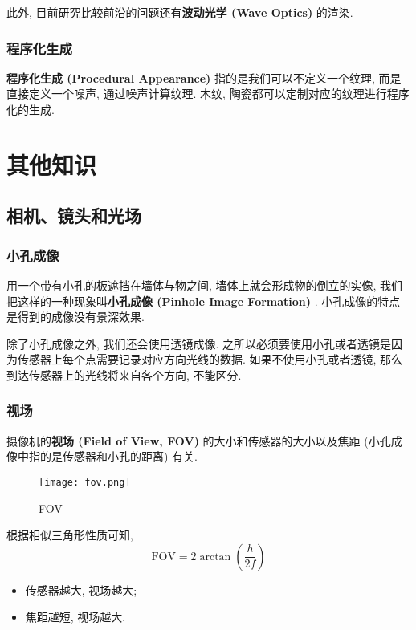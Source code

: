 \documentclass[openany]{progbookcn}
\begin{document}
此外, 目前研究比较前沿的问题还有\textbf{波动光学 (Wave Optics) }的渲染. 

\section{程序化生成}

\textbf{程序化生成 (Procedural Appearance) }指的是我们可以不定义一个纹理, 而是直接定义一个噪声, 通过噪声计算纹理. 木纹, 陶瓷都可以定制对应的纹理进行程序化的生成. 

\part{其他知识}

\chapter{相机、镜头和光场}

\section{小孔成像}

用一个带有小孔的板遮挡在墙体与物之间, 墙体上就会形成物的倒立的实像, 我们把这样的一种现象叫\textbf{小孔成像 (Pinhole Image Formation) }. 小孔成像的特点是得到的成像没有景深效果. 

除了小孔成像之外, 我们还会使用透镜成像. 之所以必须要使用小孔或者透镜是因为传感器上每个点需要记录对应方向光线的数据. 如果不使用小孔或者透镜, 那么到达传感器上的光线将来自各个方向, 不能区分. 

\section{视场}

摄像机的\textbf{视场 (Field of View, FOV) }的大小和传感器的大小以及焦距 (小孔成像中指的是传感器和小孔的距离) 有关. 

\begin{figure}[H]
	\centering
	\texttt{[image: fov.png]}
	\caption{FOV}
	\label{fig:fov}
\end{figure}

根据相似三角形性质可知, 
\begin{equation}
	\text{FOV}=2\arctan(\frac{h}{2f})
\end{equation}

\begin{itemize}
	\item 传感器越大, 视场越大; 
	\item 焦距越短, 视场越大. 
\end{itemize}
\end{document}
